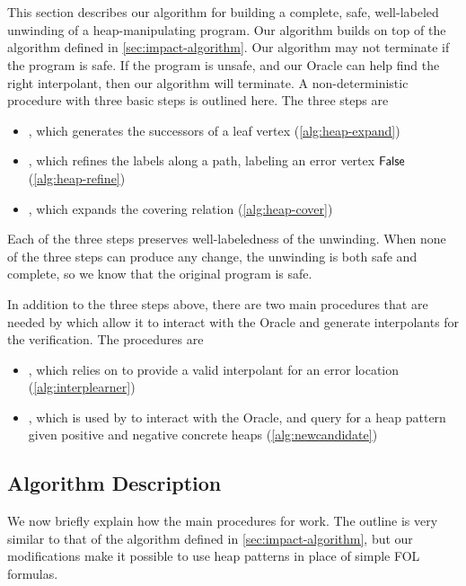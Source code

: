 \section{\verifier}
This section describes our algorithm for building a complete, safe, well-labeled unwinding
of a heap-manipulating program. Our algorithm builds on top of the \impact algorithm
defined in \autoref{sec:impact-algorithm}. Our algorithm may not terminate if the program
is safe. If the program is unsafe, and our Oracle can help find the right interpolant,
then our algorithm will terminate. A non-deterministic procedure with three basic steps is
outlined here. The three steps are

\begin{itemize}
  \item \expandp, which generates the successors of a leaf vertex (\autoref{alg:heap-expand})
  \item {}, which refines the labels along a path, labeling an error vertex $\mathsf{False}$ (\autoref{alg:heap-refine})
  \item \coverp, which expands the covering relation (\autoref{alg:heap-cover})
\end{itemize}

Each of the three steps preserves well-labeledness of the unwinding. When none of the
three steps can produce any change, the unwinding is both safe and complete, so we know
that the original program is safe.

In addition to the three steps above, there are two main procedures that are needed by
 which allow it to interact with the Oracle and generate interpolants for the
verification. The procedures are

\begin{itemize}
  \item \seplearner, which  relies on to provide a valid interpolant for an error location (\autoref{alg:interplearner})
  \item \newcandidate, which is used by \seplearner to interact with the Oracle, and query for a heap pattern given positive and negative concrete heaps (\autoref{alg:newcandidate})
\end{itemize}

\subsection{Algorithm Description}
We now briefly explain how the main procedures for \verifier work. The outline is very
similar to that of the \impact algorithm defined in \autoref{sec:impact-algorithm}, but
our modifications make it possible to use heap patterns in place of simple FOL formulas.

